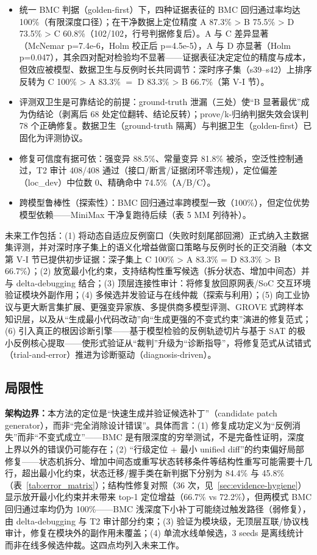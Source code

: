 \documentclass[journal]{IEEEtran}
\begin{document}
\begin{itemize}
\item 统一 BMC 判据（golden-first）下，四种证据表征的 BMC 回归通过率均达 100\%（有限深度口径）；在干净数据上定位精度 A 87.3\% > B 75.5\% > D 73.5\% > C 60.8\%（102/102，行号判据修复后）。A 与 C 差异显著（McNemar p=7.4e-6，Holm 校正后 p=4.5e-5），A 与 D 亦显著（Holm p=0.047），其余四对配对检验均不显著——证据表征决定定位的精度与成本，但效应被模型、数据卫生与反例时长共同调节：深时序子集（s39--s42）上排序反转为 C 100\% > A 83.3\% $=$ D 83.3\% > B 66.7\%（第 V-I 节）。
\item 评测双卫生是可靠结论的前提：ground-truth 泄漏（三处）使“B 显著最优”成为伪结论（剥离后 68 处定位翻转、结论反转）；prove/k-归纳判据失效会误判 78 个正确修复。数据卫生（ground-truth 隔离）与判据卫生（golden-first）已固化为评测协议。
\item 修复可信度有据可依：强变异 88.5\%、常量变异 81.8\% 被杀，空泛性控制通过，T2 审计 408/408 通过（接口/断言/证据闭环零违规），定位偏差（loc\_dev）中位数 0、精确命中 74.5\%（A/B/C）。
\item 跨模型鲁棒性（探索性）：BMC 回归通过率跨模型一致（100\%），但定位优势模型依赖——MiniMax 干净复跑待后续（表 5 MM 列待补）。
\end{itemize}

未来工作包括：(1) 将动态自适应反例窗口（失败时刻尾部回溯）正式纳入主数据集评测，并对深时序子集上的语义化增益做窗口策略与反例时长的正交消融（本文第 V-I 节已提供初步证据：深子集上 C 100\% > A 83.3\% = D 83.3\% > B 66.7\%）；(2) 放宽最小化约束，支持结构性重写候选（拆分状态、增加中间态）并与 delta-debugging 结合；(3) 顶层连接性审计：将修复放回原网表/SoC 交互环境验证模块外副作用；(4) 多候选并发验证与在线仲裁（探索与利用）；(5) 向工业协议与更大断言集扩展、更强变异家族、多提供商多模型评测、GROVE 式跨样本知识层，以及从“生成最小代码改动”向“生成更强的不变式约束”演进的修复范式；(6) 引入真正的根因诊断引擎——基于模型检验的反例轨迹切片与基于 SAT 的极小反例核心提取——使形式验证从“裁判”升级为“诊断指导”，将修复范式从试错式（trial-and-error）推进为诊断驱动（diagnosis-driven）。

\subsection{局限性}\label{sec:limitation}

\textbf{架构边界：}本方法的定位是“快速生成并验证候选补丁”（candidate patch generator），而非“完全消除设计错误”。具体而言：(1) 修复成功定义为“反例消失”而非“不变式成立”——BMC 是有限深度的穷举测试，不是完备性证明，深度上界以外的错误仍可能存在；(2) “行级定位 + 最小 unified diff”的约束偏好局部修复——状态机拆分、增加中间态或重写状态转移条件等结构性重写可能需要十几行，超出最小化约束，状态迁移/握手类在新判据下分别为 84.4\% 与 45.8\%（表~\ref{tab:error_matrix}）；结构性修复对照（36 次，见~\ref{sec:evidence-hygiene}）显示放开最小化约束并未带来 top-1 定位增益（66.7\% vs 72.2\%），但两模式 BMC 回归通过率均仍为 100\%——BMC 浅深度下小补丁可能绕过触发路径（弱修复），由 delta-debugging 与 T2 审计部分约束；(3) 验证为模块级，无顶层互联/协议栈审计，修复在模块外的副作用未覆盖；(4) 单流水线单候选，3 seeds 是离线统计而非在线多候选仲裁。这四点均列入未来工作。
\end{document}
